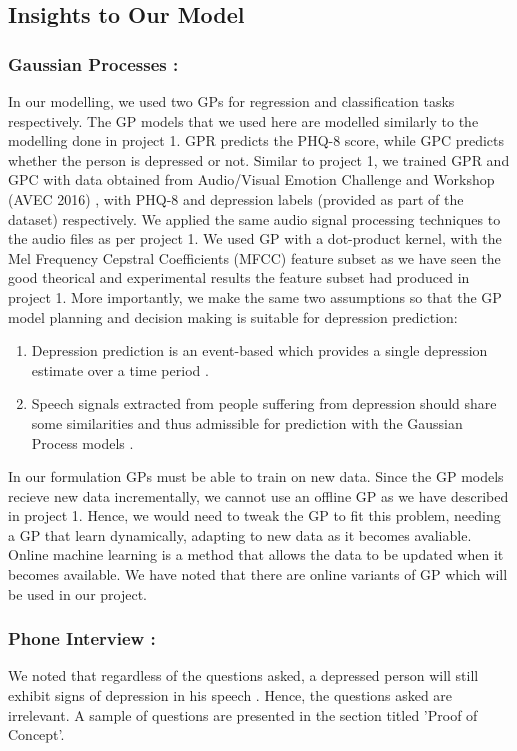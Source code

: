 \documentclass{article}
\begin{document}
	\subsection{Insights to Our Model}
	\subsubsection{Gaussian Processes :}
	In our modelling, we used two GPs for regression and classification tasks respectively. 
	The GP models that we used here are modelled similarly to the modelling done in project 1. 
	GPR predicts the PHQ-8 score, while GPC predicts whether the person is depressed or not. 
	Similar to project 1, we trained GPR and GPC with data obtained from Audio/Visual Emotion Challenge and Workshop (AVEC 2016) \cite{avec2016}, with PHQ-8 and depression labels (provided as part of the dataset) respectively. 
	We applied the same audio signal processing techniques to the audio files as per project 1. 
	We used GP with a dot-product kernel, with the Mel Frequency Cepstral Coefficients (MFCC) feature subset as we have seen the good theorical and experimental results the feature subset had produced in project 1. 
	More importantly, we make the same two assumptions so that the GP model planning and decision making is suitable for depression prediction:
	\begin{enumerate}
		\item Depression prediction is an event-based which provides a single depression estimate over a time period \cite{Valstar2016}.
		\item Speech signals extracted from people suffering from depression should share some similarities and thus admissible for prediction with the Gaussian Process models \cite{Cummins2015}.
	\end{enumerate}
	In our formulation GPs must be able to train on new data. 
	Since the GP models recieve new data incrementally, we cannot use an offline GP as we have described in project 1. 
	Hence, we would need to tweak the GP to fit this problem, needing a GP that learn dynamically, adapting to new data as it becomes avaliable. 
	Online machine learning is a method that allows the data to be updated when it becomes available. 
	We have noted that there are online variants of GP which will be used in our project.
	
	\subsubsection{Phone Interview :}
	We noted that regardless of the questions asked, a depressed person will still exhibit signs of depression in his speech \cite{jad2008}. 
	Hence, the questions asked are irrelevant. 
	A sample of questions are presented in the section titled 'Proof of Concept'.
\end{document}
